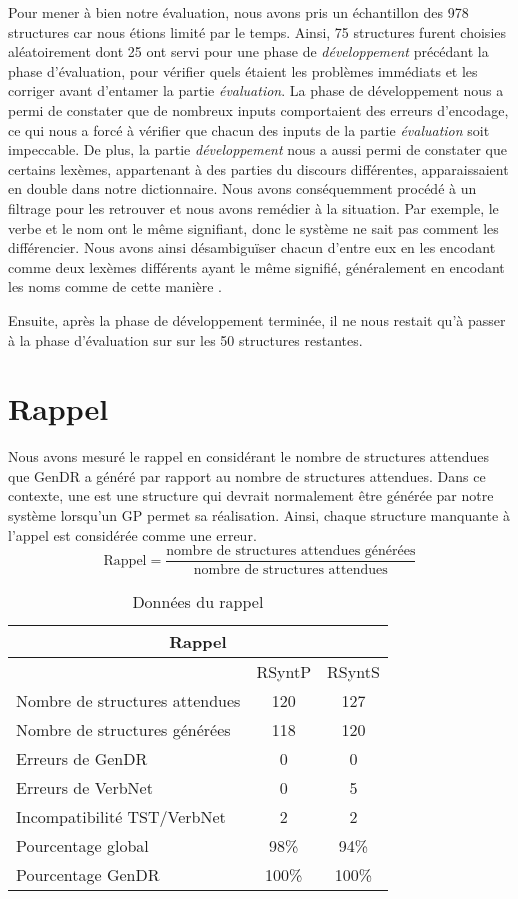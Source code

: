 Pour mener à bien notre évaluation, nous avons pris un échantillon des 978 structures car nous étions limité par le temps. Ainsi, 75 structures furent choisies aléatoirement dont 25 ont servi pour une phase de \emph{développement} précédant la phase d'évaluation, pour vérifier quels étaient les problèmes immédiats et les corriger avant d'entamer la partie \emph{évaluation}. La phase de développement nous a permi de constater que de nombreux inputs comportaient des erreurs d'encodage, ce qui nous a forcé à vérifier que chacun des inputs de la partie \emph{évaluation} soit impeccable. De plus, la partie \emph{développement} nous a aussi permi de constater que certains lexèmes, appartenant à des parties du discours différentes, apparaissaient en double dans notre dictionnaire. Nous avons conséquemment procédé à un filtrage pour les retrouver et nous avons remédier à la situation. Par exemple, le verbe  et le nom  ont le même signifiant, donc le système ne sait pas comment les différencier. Nous avons ainsi désambiguïser chacun d'entre eux en les encodant comme deux lexèmes différents ayant le même signifié, généralement en encodant les noms comme  de cette manière . 

Ensuite, après la phase de développement terminée, il ne nous restait qu'à passer à la phase d'évaluation sur sur les 50 structures restantes.
                              
\section{Rappel}
Nous avons mesuré le rappel en considérant le nombre de structures attendues que GenDR a généré par rapport au nombre de structures attendues. Dans ce contexte, une  est une structure qui devrait normalement être générée par notre système lorsqu'un \ac{GP} permet sa réalisation. Ainsi, chaque structure manquante à l'appel est considérée comme une erreur.
\[\text{Rappel} = \frac{\text{nombre de structures attendues générées}}{\text{nombre de structures attendues}}\]

\begin{table}
\caption{Données du rappel}
\begin{tabular}{ |p{6cm}||c|c|  }
 \hline
 \multicolumn{3}{|c|}{Rappel} \\
 \hline
  & RSyntP & RSyntS\\
 \hline
 Nombre de structures attendues   & 120  &127  \\
 Nombre de structures générées &  118  & 120   \\
 Erreurs de GenDR & 0 & 0\\
 Erreurs de VerbNet    & 0 & 5\\
 Incompatibilité TST/VerbNet & 2 & 2\\
 Pourcentage global & 98\%  & 94\% \\
 Pourcentage GenDR & 100\%  & 100\% \\
 \hline
\end{tabular}
\end{table}


